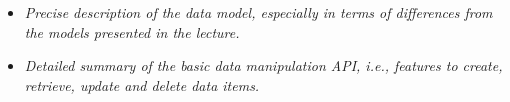 
\begin{itemize}
\item \emph{Precise description of the data model, especially in terms of differences from the  models presented in the lecture.}
\item \emph{Detailed summary of the basic data manipulation API, i.e., features to create, retrieve, update and delete data items.}
\end{itemize}